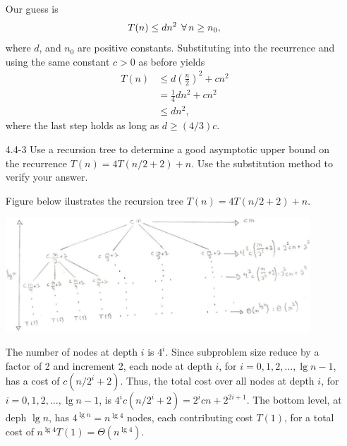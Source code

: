 \begin{enumerate}
\begin{framed}
Our guess is
\[
T(n) \le d n^2 \; \operatorname{\forall} n \ge n_0,
\]
where $d$, and $n_0$ are positive constants. Substituting into the
recurrence and using the same constant $c > 0$ as before yields
\begin{equation*}
\begin{aligned}
  T(n) &\le d \left(\frac{n}{2}\right)^2 + c n^2\\
       &= \frac{1}{4} dn^2 + cn^2\\
       &\le dn^2,
\end{aligned}
\end{equation*}
where the last step holds as long as $d \ge (4/3)c$.
\end{framed}

\newpage

\item[4.4{-}3]{Use a recursion tree to determine a good asymptotic upper bound
on the recurrence $T(n) = 4T(n/2 + 2) + n$. Use the substitution method to
verify your answer.}

\begin{framed}
Figure below ilustrates the recursion tree $T(n) = 4T(n/2 + 2) + n$.

\begin{center}
\includegraphics[width=0.9\textwidth]{images/4_4_3_1.pdf}
\end{center}

The number of nodes at depth $i$ is $4^i$. Since subproblem size reduce by
a factor of 2 and increment 2, each node at depth $i$, for
$i = 0, 1, 2, \dots, \lg n - 1$, has a cost of $c (n/2^i + 2)$. Thus, the total
cost over all nodes at depth $i$, for $i = 0, 1, 2, \dots, \lg n - 1$, is
$4^i c (n/2^i + 2) = 2^i cn + 2^{2i + 1}$. The bottom level, at deph $\lg n$,
has $4^{\lg n} = n^{\lg 4}$ nodes, each contributing cost $T(1)$, for a total
cost of $n^{\lg 4} T(1) = \Theta(n^{\lg 4})$.


\end{framed}
\end{enumerate}
